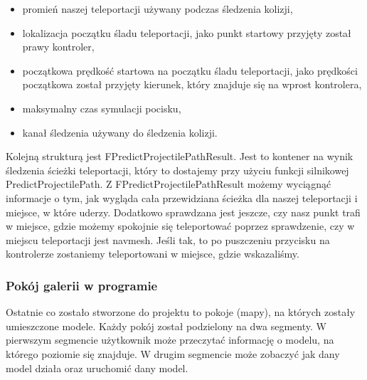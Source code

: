 \documentclass[a4paper,12pt,reqno]{article}
\begin{document}
\begin{itemize}
\item promień naszej teleportacji używany podczas śledzenia kolizji,
\item lokalizacja początku śladu teleportacji, jako punkt startowy przyjęty został prawy kontroler,
\item początkowa prędkość startowa na początku śladu teleportacji, jako prędkości początkowa został przyjęty kierunek, który znajduje się na wprost kontrolera,
\item maksymalny czas symulacji pocisku,
\item kanał śledzenia używany do śledzenia kolizji.
\end{itemize}

Kolejną strukturą jest FPredictProjectilePathResult. Jest to kontener na wynik śledzenia ścieżki teleportacji, który to dostajemy przy użyciu funkcji silnikowej PredictProjectilePath. Z FPredictProjectilePathResult możemy wyciągnąć informacje o tym, jak wygląda cała przewidziana ścieżka dla naszej teleportacji i miejsce, w które uderzy. Dodatkowo sprawdzana jest jeszcze, czy nasz punkt trafi w miejsce, gdzie możemy spokojnie się teleportować poprzez sprawdzenie, czy w miejscu teleportacji jest navmesh. Jeśli tak, to po puszczeniu przycisku na kontrolerze zostaniemy teleportowani w miejsce, gdzie wskazaliśmy.



\subsubsection{Pokój galerii w programie}

Ostatnie co zostało stworzone do projektu to pokoje (mapy), na których zostały umieszczone modele. Każdy pokój został podzielony na dwa segmenty. W pierwszym segmencie użytkownik może przeczytać informację o modelu, na którego poziomie się znajduje. W drugim segmencie może zobaczyć jak dany model działa oraz uruchomić dany model.
\end{document}
